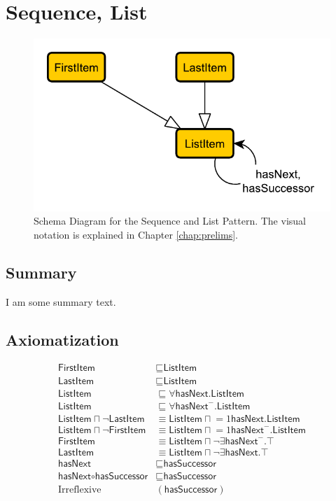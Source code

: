 \section{Sequence, List}
\label{sec:Sequence}
\begin{figure}[h!]
\begin{center}
\includegraphics[width=.8\textwidth]{figures/sequence}
\end{center}
\caption{Schema Diagram for the Sequence and List Pattern. The visual notation is explained in Chapter \ref{chap:prelims}.}
\label{fig:Spatiotemporal}
\label{fig:Sequence,}
\end{figure}
\subsection{Summary}
\label{sum:Sequence}
I am some summary text. \cite{tree}

\subsection{Axiomatization}
\label{axs:Sequence,}
\begin{align}
\textsf{FirstItem} &\sqsubseteq \textsf{ListItem} \\
\textsf{LastItem} &\sqsubseteq \textsf{ListItem} \\
\textsf{ListItem} &\sqsubseteq \forall \textsf{hasNext.ListItem} \\
\textsf{ListItem} &\sqsubseteq \forall \textsf{hasNext}^-\textsf{.ListItem} \\
\textsf{ListItem} \sqcap \lnot \textsf{LastItem} &\equiv \textsf{ListItem} \sqcap \mathord{=1}\textsf{hasNext.ListItem} \\
\textsf{ListItem} \sqcap \lnot \textsf{FirstItem} &\equiv \textsf{ListItem} \sqcap \mathord{=1}\textsf{hasNext}^- \textsf{.ListItem} \\
\textsf{FirstItem} &\equiv \textsf{ListItem} \sqcap \lnot \exists \textsf{hasNext}^-\textsf{.}\top \\
\textsf{LastItem} &\equiv \textsf{ListItem} \sqcap \lnot \exists \textsf{hasNext.}\top \\
\textsf{hasNext} &\sqsubseteq \textsf{hasSuccessor} \\
\textsf{hasNext} \circ \textsf{hasSuccessor} &\sqsubseteq \textsf{hasSuccessor} \\
\text{Irreflexive}&(\textsf{hasSuccessor})
\end{align}

